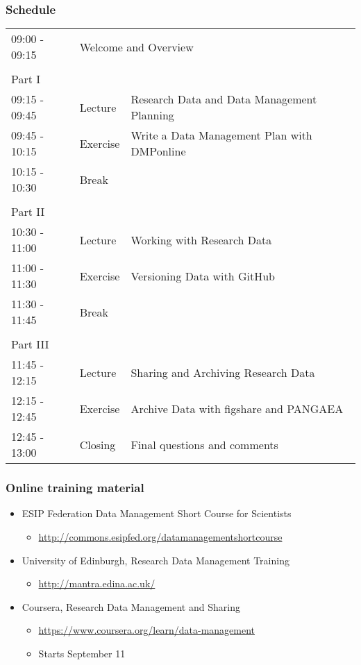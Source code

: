 \documentclass{beamer}
\begin{document}
\begin{frame}
  \frametitle{Schedule}
  \small
  \begin{center}
  \begin{tabular}{llp{7cm}}
  09:00 - 09:15 & \multicolumn{2}{l}{Welcome and Overview} \\
  & & \\	
  Part I & \\	
  \hline
  09:15 - 09:45 & Lecture & Research Data and Data Management Planning \\
  09:45 - 10:15 & Exercise & Write a Data Management Plan with DMPonline \\ 
  10:15 - 10:30 & Break & \\
  & & \\
  Part II & \\
  \hline 
  10:30 - 11:00 & Lecture & Working with Research Data \\
  11:00 - 11:30 & Exercise & Versioning Data with GitHub \\
  11:30 - 11:45 & Break & \\
  & & \\
  Part III & \\
  \hline 
  11:45 - 12:15 & Lecture & Sharing and Archiving Research Data \\
  12:15 - 12:45 & Exercise & Archive Data with figshare and PANGAEA \\
  12:45 - 13:00 & Closing & Final questions and comments \\
  \end{tabular}
  \end{center}
\end{frame}

\begin{frame}
  \frametitle{Online training material}
  
  \begin{itemize}
    \item ESIP Federation Data Management Short Course for Scientists 
    \begin{itemize}
      \item \url{http://commons.esipfed.org/datamanagementshortcourse}
    \end{itemize}
    \item University of Edinburgh, Research Data Management Training
    \begin{itemize}
      \item \url{http://mantra.edina.ac.uk/}
    \end{itemize}
    \item Coursera, Research Data Management and Sharing
    \begin{itemize}
      \item \url{https://www.coursera.org/learn/data-management}
      \item Starts September 11
    \end{itemize}
  \end{itemize}
\end{frame}
\end{document}
